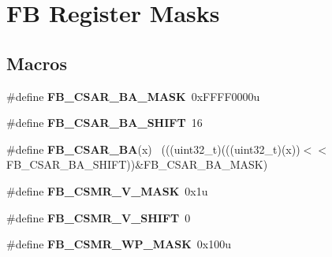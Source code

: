 \hypertarget{group___f_b___register___masks}{}\section{F\+B Register Masks}
\label{group___f_b___register___masks}
\subsection*{Macros}
\begin{DoxyCompactItemize}
\item 
\hypertarget{group___f_b___register___masks_ga917335c957f6472faf91ae0b244db487}{}\#define {\bfseries F\+B\+\_\+\+C\+S\+A\+R\+\_\+\+B\+A\+\_\+\+M\+A\+S\+K}~0x\+F\+F\+F\+F0000u\label{group___f_b___register___masks_ga917335c957f6472faf91ae0b244db487}

\item 
\hypertarget{group___f_b___register___masks_ga098f6109a1dcc8cc007bca53c312810f}{}\#define {\bfseries F\+B\+\_\+\+C\+S\+A\+R\+\_\+\+B\+A\+\_\+\+S\+H\+I\+F\+T}~16\label{group___f_b___register___masks_ga098f6109a1dcc8cc007bca53c312810f}

\item 
\hypertarget{group___f_b___register___masks_ga4241bb44a894dd2be2480feaf7eb2e21}{}\#define {\bfseries F\+B\+\_\+\+C\+S\+A\+R\+\_\+\+B\+A}(x)                                                    ~(((uint32\+\_\+t)(((uint32\+\_\+t)(x))$<$$<$F\+B\+\_\+\+C\+S\+A\+R\+\_\+\+B\+A\+\_\+\+S\+H\+I\+F\+T))\&F\+B\+\_\+\+C\+S\+A\+R\+\_\+\+B\+A\+\_\+\+M\+A\+S\+K)\label{group___f_b___register___masks_ga4241bb44a894dd2be2480feaf7eb2e21}

\item 
\hypertarget{group___f_b___register___masks_ga746554e800a78e64f18c333f8b3dbd2c}{}\#define {\bfseries F\+B\+\_\+\+C\+S\+M\+R\+\_\+\+V\+\_\+\+M\+A\+S\+K}~0x1u\label{group___f_b___register___masks_ga746554e800a78e64f18c333f8b3dbd2c}

\item 
\hypertarget{group___f_b___register___masks_ga62bde86e3e74e677b6cb555c806d1dc3}{}\#define {\bfseries F\+B\+\_\+\+C\+S\+M\+R\+\_\+\+V\+\_\+\+S\+H\+I\+F\+T}~0\label{group___f_b___register___masks_ga62bde86e3e74e677b6cb555c806d1dc3}

\item 
\hypertarget{group___f_b___register___masks_ga40725292274706aa0a0c013201498f4b}{}\#define {\bfseries F\+B\+\_\+\+C\+S\+M\+R\+\_\+\+W\+P\+\_\+\+M\+A\+S\+K}~0x100u\label{group___f_b___register___masks_ga40725292274706aa0a0c013201498f4b}


\end{DoxyCompactItemize}

